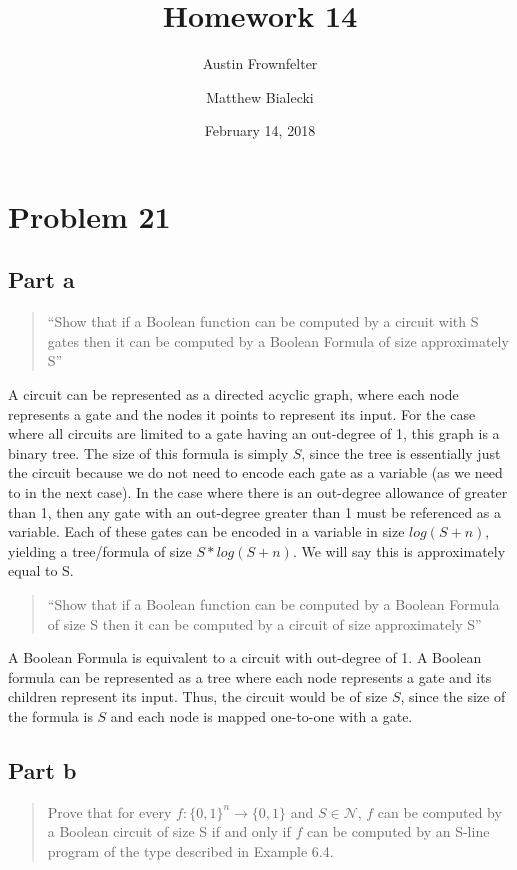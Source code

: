 \documentclass{article}
\title{Homework 14}
\author{Austin Frownfelter \and Matthew Bialecki}
\date{February 14, 2018}
\begin{document}
\maketitle

\section{Problem 21}
\subsection{Part a}
\begin{quote}
``Show that if a Boolean function can be computed by a circuit with S gates then it can be computed by a Boolean Formula of size approximately S''
\end{quote}

A circuit can be represented as a directed acyclic graph, where each node represents a gate and the nodes it points to represent its input.  For the case where all circuits are limited to a gate having an out-degree of 1, this graph is a binary tree.  The size of this formula is simply $S$, since the tree is essentially just the circuit because we do not need to encode each gate as a variable (as we need to in the next case).  In the case where there is an out-degree allowance of greater than 1, then any gate with an out-degree greater than 1 must be referenced as a variable.  Each of these gates can be encoded in a variable in size $log(S+n)$, yielding a tree/formula of size $S*log(S+n)$.  We will say this is approximately equal to S.

\begin{quote}
``Show that if a Boolean function can be computed by a Boolean Formula of size S then it can be computed by a circuit of size approximately S''
\end{quote}

A Boolean Formula is equivalent to a circuit with out-degree of 1.  A Boolean formula can be represented as a tree where each node represents a gate and its children represent its input.  Thus, the circuit would be of size $S$, since the size of the formula is $S$ and each node is mapped one-to-one with a gate.

\subsection{Part b}
\begin{quote}
Prove that for every $f: \{0, 1\}^{n} \rightarrow \{0,1\}$ and $S \in \mathcal{N}$, $f$ can be computed by a Boolean circuit of size S if and only if $f$ can be computed by an S-line program of the type described in Example 6.4.
\end{quote}
\end{document}
